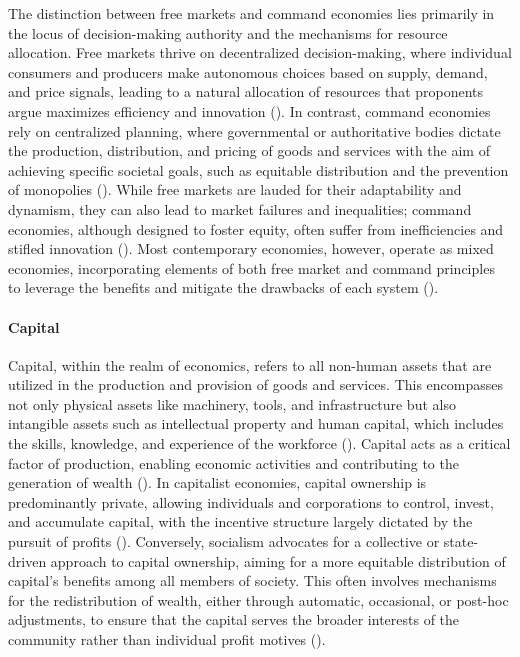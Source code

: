 \documentclass{article}
\begin{document}
The distinction between free markets and command economies lies primarily in the locus of decision-making authority and the mechanisms for resource allocation. Free markets thrive on decentralized decision-making, where individual consumers and producers make autonomous choices based on supply, demand, and price signals, leading to a natural allocation of resources that proponents argue maximizes efficiency and innovation (\cite{friedman}). In contrast, command economies rely on centralized planning, where governmental or authoritative bodies dictate the production, distribution, and pricing of goods and services with the aim of achieving specific societal goals, such as equitable distribution and the prevention of monopolies (\cite{hayek}). While free markets are lauded for their adaptability and dynamism, they can also lead to market failures and inequalities; command economies, although designed to foster equity, often suffer from inefficiencies and stifled innovation (\cite{marx}). Most contemporary economies, however, operate as mixed economies, incorporating elements of both free market and command principles to leverage the benefits and mitigate the drawbacks of each system (\cite{mixedEconomy}).

\paragraph{Capital}
Capital, within the realm of economics, refers to all non-human assets that are utilized in the production and provision of goods and services. This encompasses not only physical assets like machinery, tools, and infrastructure but also intangible assets such as intellectual property and human capital, which includes the skills, knowledge, and experience of the workforce (\cite{smith}). Capital acts as a critical factor of production, enabling economic activities and contributing to the generation of wealth (\cite{marx}). In capitalist economies, capital ownership is predominantly private, allowing individuals and corporations to control, invest, and accumulate capital, with the incentive structure largely dictated by the pursuit of profits (\cite{sweezy}). Conversely, socialism advocates for a collective or state-driven approach to capital ownership, aiming for a more equitable distribution of capital's benefits among all members of society. This often involves mechanisms for the redistribution of wealth, either through automatic, occasional, or post-hoc adjustments, to ensure that the capital serves the broader interests of the community rather than individual profit motives (\cite{socialismToday}).\par
\end{document}
